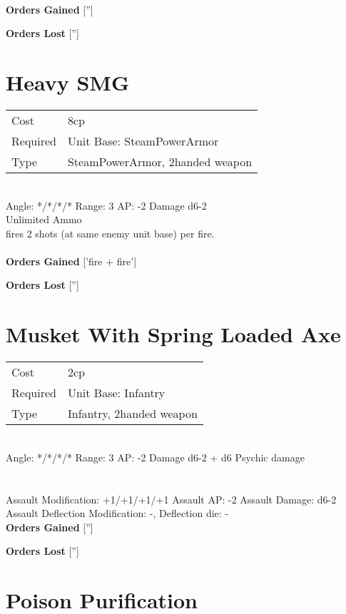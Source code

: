 \ \\

{\bf Orders Gained}
['']

{\bf Orders Lost}
['']
\section{ Heavy SMG }

\begin{tabular}{ll}
    Cost & 8cp \\
    Required & Unit Base: SteamPowerArmor\\
    Type & SteamPowerArmor, 2handed weapon\\
\end{tabular}
\ \\
\indent Angle: */*/*/* Range: 3  AP: -2 Damage d6-2 \\
Unlimited Ammo \\ fires 2 shots (at same enemy unit base) per fire. \\ 
\ \\

{\bf Orders Gained}
['fire + fire']

{\bf Orders Lost}
['']
\section{ Musket With Spring Loaded Axe }

\begin{tabular}{ll}
    Cost & 2cp \\
    Required & Unit Base: Infantry\\
    Type & Infantry, 2handed weapon\\
\end{tabular}
\ \\
\indent Angle: */*/*/* Range: 3  AP: -2 Damage d6-2 + d6 Psychic damage \\
 \\
\ \\
Assault Modification: +1/+1/+1/+1 Assault AP: -2 Assault Damage: d6-2\\
Assault Deflection Modification: -, Deflection die: - \\


{\bf Orders Gained}
['']

{\bf Orders Lost}
['']


\section{ Poison Purification }

